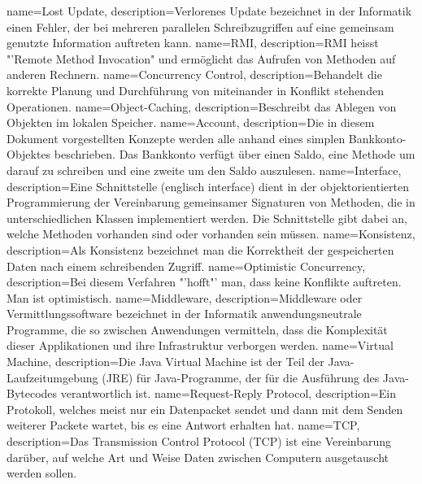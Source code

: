 {
  name=Lost Update,
  description={Verlorenes Update bezeichnet in der Informatik einen Fehler, der bei mehreren parallelen Schreibzugriffen auf eine gemeinsam genutzte Information auftreten kann.}
}
{
  name=RMI,
  description={RMI heisst "'Remote Method Invocation" und ermöglicht das Aufrufen von Methoden auf anderen Rechnern.}
}
{
  name=Concurrency Control,
  description={Behandelt die korrekte Planung und Durchführung von miteinander in Konflikt stehenden Operationen.}
}
{
  name=Object-Caching,
  description={Beschreibt das Ablegen von Objekten im lokalen Speicher.}
}
{
  name=Account,
  description={Die in diesem Dokument vorgestellten Konzepte werden alle anhand eines simplen Bankkonto-Objektes beschrieben. Das Bankkonto verfügt über einen Saldo, eine Methode um darauf zu schreiben und eine zweite um den Saldo auszulesen. }
}
{
  name=Interface,
  description={Eine Schnittstelle (englisch interface) dient in der objektorientierten Programmierung der Vereinbarung gemeinsamer Signaturen von Methoden, die in unterschiedlichen Klassen implementiert werden. Die Schnittstelle gibt dabei an, welche Methoden vorhanden sind oder vorhanden sein müssen.}
}
{
  name=Konsistenz,
  description={Als Konsistenz bezeichnet man die Korrektheit der gespeicherten Daten nach einem schreibenden Zugriff.}
}
{
  name=Optimistic Concurrency,
  description={Bei diesem Verfahren "'hofft"' man, dass keine Konflikte auftreten. Man ist optimistisch.}
}
{
  name=Middleware,
  description={Middleware oder Vermittlungssoftware bezeichnet in der Informatik anwendungsneutrale Programme, die so zwischen Anwendungen vermitteln, dass die Komplexität dieser Applikationen und ihre Infrastruktur verborgen werden.}
}
{
  name=Virtual Machine,
  description={Die Java Virtual Machine ist der Teil der Java-Laufzeitumgebung (JRE) für Java-Programme, der für die Ausführung des Java-Bytecodes verantwortlich ist.}
}
{
  name=Request-Reply Protocol,
  description={Ein Protokoll, welches meist nur ein Datenpacket sendet und dann mit dem Senden weiterer Packete wartet, bis es eine Antwort erhalten hat.}
}
{
  name=TCP,
  description={Das Transmission Control Protocol (TCP) ist eine Vereinbarung darüber, auf welche Art und Weise Daten zwischen Computern ausgetauscht werden sollen.}
}
